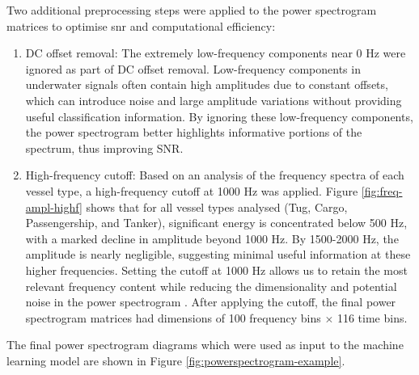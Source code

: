 Two additional preprocessing steps were applied to the power spectrogram matrices to optimise \acrshort{snr} and computational efficiency:
\begin{enumerate}
    \item DC offset removal: The extremely low-frequency components near 0 Hz were ignored as part of DC offset removal. Low-frequency components in underwater signals often contain high amplitudes due to constant offsets, which can introduce noise and large amplitude variations without providing useful classification information. By ignoring these low-frequency components, the power spectrogram better highlights informative portions of the spectrum, thus improving SNR.

    \item High-frequency cutoff: Based on an analysis of the frequency spectra of each vessel type, a high-frequency cutoff at 1000 Hz was applied. Figure \ref{fig:freq-ampl-highf} shows that for all vessel types analysed (Tug, Cargo, Passengership, and Tanker), significant energy is concentrated below 500 Hz, with a marked decline in amplitude beyond 1000 Hz. By 1500-2000 Hz, the amplitude is nearly negligible, suggesting minimal useful information at these higher frequencies. Setting the cutoff at 1000 Hz allows us to retain the most relevant frequency content while reducing the dimensionality and potential noise in the power spectrogram \cite{premus_machine_2020}. After applying the cutoff, the final power spectrogram matrices had dimensions of 100 frequency bins $\times$ 116 time bins.
\end{enumerate}
The final power spectrogram diagrams which were used as input to the machine learning model are shown in Figure \ref{fig:powerspectrogram-example}.

